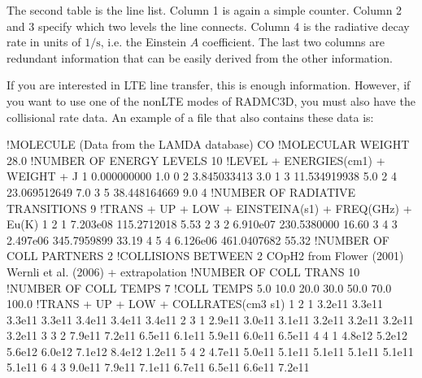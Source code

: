 \documentclass[letterpaper,10pt,english]{sphinxmanual}
\begin{document}
The second table is the line list. Column 1 is again a simple counter.  Column 2
and 3 specify which two levels the line connects. Column 4 is the radiative
decay rate in units of \(1/\mathrm{s}\), i.e. the Einstein \(A\)
coefficient. The last two columns are redundant information that can be easily
derived from the other information.

If you are interested in LTE line transfer, this is enough information.
However, if you want to use one of the non\sphinxhyphen{}LTE modes of RADMC\sphinxhyphen{}3D, you must
also have the collisional rate data. An example of a 
file that also contains these data is:

\begin{sphinxVerbatim}[commandchars=\\\{\}]
!MOLECULE (Data from the LAMDA database)
CO
!MOLECULAR WEIGHT
28.0
!NUMBER OF ENERGY LEVELS
10
!LEVEL + ENERGIES(cm\PYGZca{}\PYGZhy{}1) + WEIGHT + J
    1     0.000000000  1.0     0
    2     3.845033413  3.0     1
    3    11.534919938  5.0     2
    4    23.069512649  7.0     3
    5    38.448164669  9.0     4
!NUMBER OF RADIATIVE TRANSITIONS
9
!TRANS + UP + LOW + EINSTEINA(s\PYGZca{}\PYGZhy{}1) + FREQ(GHz) + E\PYGZus{}u(K)
    1     2     1   7.203e\PYGZhy{}08     115.2712018      5.53
    2     3     2   6.910e\PYGZhy{}07     230.5380000     16.60
    3     4     3   2.497e\PYGZhy{}06     345.7959899     33.19
    4     5     4   6.126e\PYGZhy{}06     461.0407682     55.32
!NUMBER OF COLL PARTNERS
2
!COLLISIONS BETWEEN
2 CO\PYGZhy{}pH2 from Flower (2001) \PYGZam{} Wernli et al. (2006) + extrapolation
!NUMBER OF COLL TRANS
10
!NUMBER OF COLL TEMPS
7
!COLL TEMPS
    5.0   10.0   20.0   30.0   50.0   70.0  100.0
!TRANS + UP + LOW + COLLRATES(cm\PYGZca{}3 s\PYGZca{}\PYGZhy{}1)
    1     2     1  3.2e\PYGZhy{}11 3.3e\PYGZhy{}11 3.3e\PYGZhy{}11 3.3e\PYGZhy{}11 3.4e\PYGZhy{}11 3.4e\PYGZhy{}11 3.4e\PYGZhy{}11
    2     3     1  2.9e\PYGZhy{}11 3.0e\PYGZhy{}11 3.1e\PYGZhy{}11 3.2e\PYGZhy{}11 3.2e\PYGZhy{}11 3.2e\PYGZhy{}11 3.2e\PYGZhy{}11
    3     3     2  7.9e\PYGZhy{}11 7.2e\PYGZhy{}11 6.5e\PYGZhy{}11 6.1e\PYGZhy{}11 5.9e\PYGZhy{}11 6.0e\PYGZhy{}11 6.5e\PYGZhy{}11
    4     4     1  4.8e\PYGZhy{}12 5.2e\PYGZhy{}12 5.6e\PYGZhy{}12 6.0e\PYGZhy{}12 7.1e\PYGZhy{}12 8.4e\PYGZhy{}12 1.2e\PYGZhy{}11
    5     4     2  4.7e\PYGZhy{}11 5.0e\PYGZhy{}11 5.1e\PYGZhy{}11 5.1e\PYGZhy{}11 5.1e\PYGZhy{}11 5.1e\PYGZhy{}11 5.1e\PYGZhy{}11
    6     4     3  9.0e\PYGZhy{}11 7.9e\PYGZhy{}11 7.1e\PYGZhy{}11 6.7e\PYGZhy{}11 6.5e\PYGZhy{}11 6.6e\PYGZhy{}11 7.2e\PYGZhy{}11

\end{sphinxVerbatim}
\end{document}
